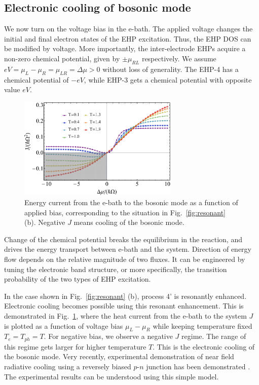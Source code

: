 \documentclass[aps,prb,
,floatfix,footinbib,shortbibliography,
preprint
]{revtex4-1}
\begin{document}

\subsection{Electronic cooling of bosonic mode}
We now turn on the voltage bias in the e-bath.
The applied voltage changes the initial and final electron states of the EHP excitation. Thus, the EHP DOS can be modified by voltage. More importantly, the inter-electrode EHPs acquire a non-zero chemical potential, given by $\pm \mu_{RL}$ respectively. We assume $eV=\mu_L-\mu_R=\mu_{LR}= \Delta \mu>0$ without loss of generality. The EHP-4 has a chemical potential of $-eV$, while EHP-3 gets a chemical potential with opposite value $eV$. 
\begin{figure}[h]
	\includegraphics[width=3in,angle=0]{figures-0208/fig_5.pdf}	
	\caption{Energy current from the e-bath to the bosonic mode as a function of applied bias, corresponding to the situation in Fig.~\ref{fig:resonant} (b). Negative $J$ means cooling of the bosonic mode.  }
	\label{fig:cooling}
\end{figure}
Change of the chemical potential breaks the equilibrium in the reaction, and drives the energy transport between e-bath and the system. 
Direction of energy flow depends on the relative magnitude of two fluxes. It can be engineered by tuning the electronic band structure, or more specifically, the transition probability of the two types of EHP excitation. 

In the case shown in Fig.~\ref{fig:resonant} (b), process 4' is resonantly enhanced. Electronic cooling becomes possible using this resonant enhancement. This is demonstrated in Fig.~\ref{fig:cooling}, where the heat current from the e-bath to the system $J$ is plotted as a function of voltage bias $\mu_L-\mu_R$ while keeping temperature fixed $T_e=T_{ph}=T$. For negative bias, we observe a negative $J$ regime. The range of this regime gets larger for higher temperature $T$. This is the electronic cooling of the bosonic mode. Very recently, experimental demonstration of near field radiative cooling using a reversely biased $p$-$n$ junction has been demonstrated \cite{zhu2019near}. The experimental results can be understood using this simple model.
\end{document}
